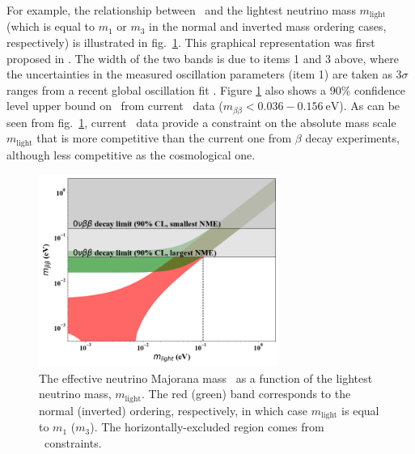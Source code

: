 For example, the relationship between \mbb\ and the lightest neutrino mass $m_{\text{light}}$ (which is equal to $m_1$ or $m_3$ in the normal and inverted mass ordering cases, respectively) is illustrated in fig.~\ref{fig:mbetabetavsmlight}. This graphical representation was first proposed in \cite{Vissani:1999tu}. The width of the two bands is due to items 1 and 3 above, where the uncertainties in the measured oscillation parameters (item 1) are taken as $3\sigma$ ranges from a recent global oscillation fit \cite{Esteban:2020cvm}. Figure \ref{fig:mbetabetavsmlight} also shows a 90\% confidence level upper bound on \mbb\ from current \bbonu\ data ($m_{\beta\beta}<0.036-0.156\ \text{eV}$). As can be seen from fig.~\ref{fig:mbetabetavsmlight}, current \bbonu\ data provide a constraint on the absolute mass scale $m_{\text{light}}$ that is more competitive than the current one from $\beta$ decay experiments, although less competitive as the cosmological one.
%
\begin{figure}[t!b!]
\begin{center}
\includegraphics[width=0.7\textwidth]{img/mbetabetavsmlight.png}
\end{center}
\caption{\label{fig:mbetabetavsmlight}The effective neutrino Majorana mass \mbb\ as a function of the lightest neutrino mass, $m_{\text{light}}$. The red (green) band corresponds to the normal (inverted) ordering, respectively, in which case $m_{\text{light}}$ is equal to $m_1$ ($m_3$). The horizontally-excluded region comes from \bbonu\ constraints.}
\end{figure}

